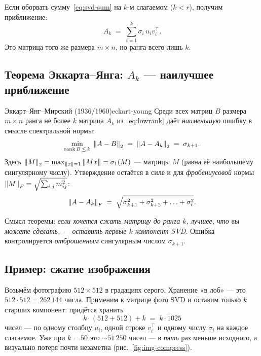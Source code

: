 Если оборвать сумму~\eqref{eq:svd-sum} на $k$-м слагаемом ($k<r$),
получим приближение:
\begin{equation}\label{eq:lowrank}
A_k \;=\; \sum_{i=1}^{k}\sigma_i\,u_i v_i^{\!\top}.
\end{equation}
Это матрица того же размера $m\times n$, но ранга всего лишь $k$.

\subsection{Теорема Эккарта--Янга: $A_k$ — наилучшее приближение}

\begin{theorem}{Эккарт--Янг--Мирский (1936/1960)}{eckart-young}
Среди всех матриц $B$ размера $m\times n$ ранга не более $k$
матрица $A_k$ из~\eqref{eq:lowrank} даёт \emph{наименьшую} ошибку
в смысле спектральной нормы:
\begin{equation}\label{eq:ey}
\min_{\mathrm{rank}\,B\,\leq\,k}\;\left\|A-B\right\|_{2}\;=\;\left\|A-A_k\right\|_{2}\;=\;\sigma_{k+1}.
\end{equation}
Здесь $\left\|M\right\|_2 = \max_{\left\|x\right\|=1}\left\|Mx\right\|=\sigma_1(M)$ —
 матрицы $M$ (равна её наибольшему
сингулярному числу). Утверждение остаётся в силе и для
\emph{фробениусовой} нормы $\left\|M\right\|_F=\sqrt{\sum_{i,j} m_{ij}^{2}}$:
\[
\left\|A-A_k\right\|_F\;=\;\sqrt{\sigma_{k+1}^{2}+\sigma_{k+2}^{2}+\ldots+\sigma_r^{2}}.
\]
\end{theorem}

Смысл теоремы: \emph{если хочется сжать матрицу до ранга $k$, лучшее,
что вы можете сделать, — оставить первые $k$ компонент SVD}.
Ошибка контролируется \emph{отброшенным} сингулярным числом
$\sigma_{k+1}$.

\subsection{Пример: сжатие изображения}

Возьмём фотографию $512\times 512$ в градациях серого. Хранение
«в лоб» — это $512\cdot 512 = 262\,144$ числа. Применим к матрице
фото SVD и оставим только $k$ старших компонент: придётся хранить
\[
k\cdot(512+512)+k\;=\;k\cdot 1025
\]
чисел — по одному столбцу $u_i$, одной строке $v_i^{\!\top}$ и
одному числу $\sigma_i$ на каждое слагаемое. Уже при $k=50$ это
$\sim 51\,250$ чисел — в \emph{пять} раз меньше исходного,
а визуально потеря почти незаметна (рис.~\ref{fig:img-compress}).

